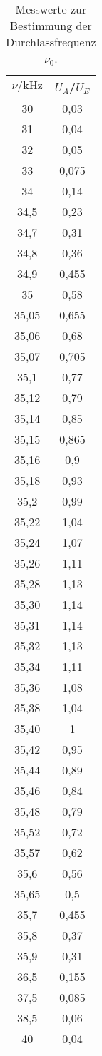 \begin{table}
  \centering
  \caption{Messwerte zur Bestimmung der Durchlassfrequenz $\nu_0$.}
  \label{tab:tab1}
  \begin{tabular}{c c}
    \toprule
    $\nu/\si{\kilo\hertz}$ & $U_A$/$U_E$ \\
    \midrule
    30    & 0,03\\
    31    & 0,04\\
    32    & 0,05\\
    33    & 0,075\\
    34    & 0,14\\
    34,5  & 0,23\\
    34,7  & 0,31\\
    34,8  & 0,36\\
    34,9  & 0,455\\
    35    & 0,58\\
    35,05 & 0,655\\
    35,06 & 0,68\\
    35,07 & 0,705\\
    35,1  & 0,77\\
    35,12 & 0,79\\
    35,14 & 0,85\\
    35,15 & 0,865\\
    35,16 & 0,9\\
    35,18 & 0,93\\
    35,2  & 0,99\\
    35,22 & 1,04\\
    35,24 & 1,07\\
    35,26 & 1,11\\
    35,28 & 1,13\\
    35,30 & 1,14\\
    35,31 & 1,14\\
    35,32 & 1,13\\
    35,34 & 1,11\\
    35,36 & 1,08\\
    35,38 & 1,04\\
    35,40 & 1\\
    35,42 & 0,95\\
    35,44 & 0,89\\
    35,46 & 0,84\\
    35,48 & 0,79\\
    35,52 & 0,72\\
    35,57 & 0,62\\
    35,6  & 0,56\\
    35,65 & 0,5\\
    35,7  & 0,455\\
    35,8  & 0,37\\
    35,9  & 0,31\\
    36,5  & 0,155\\
    37,5  & 0,085\\
    38,5  & 0,06\\
    40    & 0,04\\
  \bottomrule
  \end{tabular}
\end{table}
